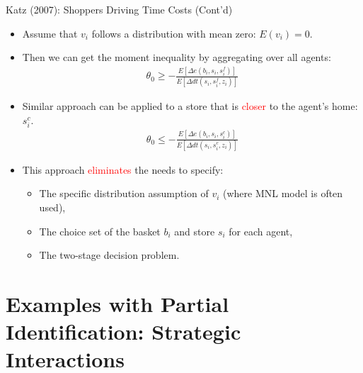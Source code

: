 \documentclass[aspectratio=169]{beamer}  %
\begin{document}
\begin{frame}{Katz (2007): Shoppers Driving Time Costs (Cont'd)}
    \begin{itemize}
    \item Assume that $v_i$ follows a distribution with mean zero: $E(v_i) = 0$.
    \item Then we can get the moment inequality by aggregating over all agents:
    \begin{align*}
        \theta_0 \geq - \frac{E[\Delta e(b_i, s_i, s_i^f)]}{E[\Delta dt(s_i, s_i^f, z_i)]}
    \end{align*}
    \item Similar approach can be applied to a store that is \textcolor{red}{closer} to the agent's home: $s_i^{c}$.
    \begin{align*}
        \theta_0 \leq - \frac{E[\Delta e(b_i, s_i, s_i^c)]}{E[\Delta dt(s_i, s_i^c, z_i)]}
    \end{align*}
    \item This approach \textcolor{red}{eliminates} the needs to specify: 
        \begin{itemize}
            \item The specific distribution assumption of $v_i$ (where MNL model is often used),
            \item The choice set of the basket $b_i$ and store $s_i$ for each agent,
            \item The two-stage decision problem.
        \end{itemize} 
    \end{itemize}
\end{frame}

\section{Examples with Partial Identification: Strategic Interactions}
\end{document}
